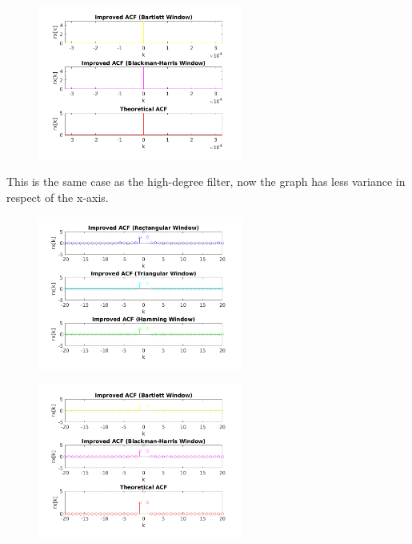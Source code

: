 \documentclass[a4paper,11pt]{article}
\begin{document}
\begin{figure}[!hp]
    \begin{center}
      \includegraphics[width=0.6\textwidth]{images/study2/acf_ld_plot2.png}
    \end{center}
\end{figure}

This is the same case as the high-degree filter, now the graph has less variance
in respect of the x-axis.

\newpage

\begin{figure}[!hp]
    \begin{center}
      \includegraphics[width=0.6\textwidth]{images/study2/acf_ld_stem1.png}
    \end{center}
\end{figure}

\begin{figure}[!hp]
    \begin{center}
      \includegraphics[width=0.6\textwidth]{images/study2/acf_ld_stem2.png}
    \end{center}
\end{figure}
\end{document}
